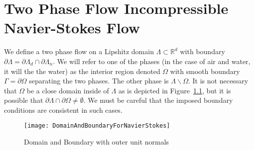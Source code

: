 \documentclass[letterpaper]{erdc}
\begin{document}
%
%
%
%
\chapter{Two Phase Flow Incompressible Navier-Stokes Flow}\label{ch:2PFlow}

We define a two phase flow on a Lipshitz domain $\Lambda\subset\mathbb{R}^d$ with boundary $\partial\Lambda = \partial\Lambda_{d}\cap\partial\Lambda_{n}$.  We will refer to one of the phases (in the case of air and water, it will the the water) as the interior region denoted $\Omega$ with smooth boundary $\Gamma = \partial\Omega$ separating the two phases.  The other phase is $\Lambda\backslash\Omega$.  It is not necessary that $\Omega$ be a close domain inside of $\Lambda$ as is depicted in Figure~\ref{fig:DomainAndBoundary}, but it is possible that $\partial\Lambda\cap \partial\Omega \neq \emptyset$.  We must be careful that the imposed boundary conditions are consistent in such cases.
\begin{figure}[h!]
  \centering
    \texttt{[image: DomainAndBoundaryForNavierStokes]}
  \caption{Domain and Boundary with outer unit normals}
  \label{fig:DomainAndBoundary}
\end{figure}
\end{document}
